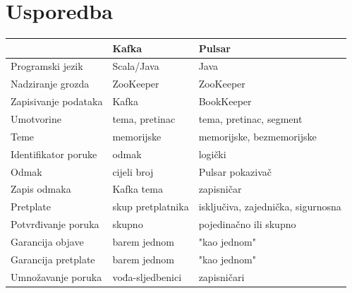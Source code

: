 \documentclass[utf8, diplomski, lmodern, numeric]{fer}
\begin{document}
\section{Usporedba}

\begin{table}[H]

\begin{adjustwidth}{-15mm}{15mm}

\begin{tabular}{|l|l|l|}
\hline
                            & \textbf{Kafka}                & \textbf{Pulsar}                                \\ \hline
Programski jezik            & Scala/Java                    & Java                                           \\ \hline
Nadziranje grozda           & ZooKeeper                     & ZooKeeper                                      \\ \hline
Zapisivanje podataka        & Kafka                         & BookKeeper                                     \\ \hline
Umotvorine                  & tema, pretinac                & tema, pretinac, segment                        \\ \hline
Teme                        & memorijske                    & memorijske, bezmemorijske                      \\ \hline
Identifikator poruke        & odmak                         & logički                                        \\ \hline
Odmak                       & cijeli broj                   & Pulsar pokazivač                               \\ \hline
Zapis odmaka                & Kafka tema                    & zapisničar                                     \\ \hline
Pretplate                   & skup pretplatnika             & isključiva, zajednička, sigurnosna             \\ \hline
Potvrđivanje poruka         & skupno                        & pojedinačno ili skupno                         \\ \hline
Garancija objave            & barem jednom                  & "kao jednom"                                   \\ \hline
Garancija pretplate         & barem jednom                  & "kao jednom"                                   \\ \hline
Umnožavanje poruka          & vođa-sljedbenici              & zapisničari                                    \\ \hline

\end{tabular}
\end{adjustwidth}
\end{table}
\end{document}
